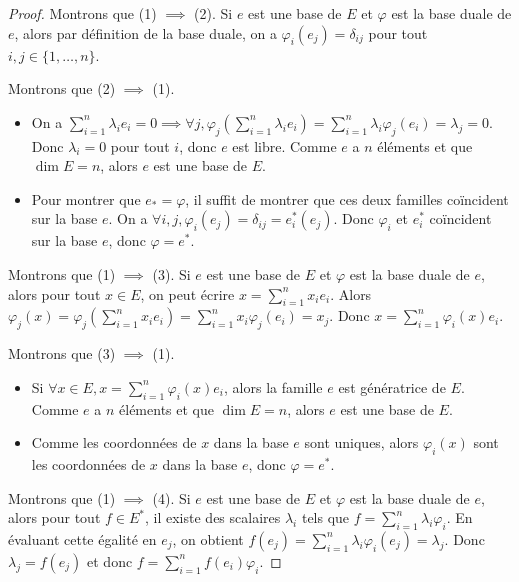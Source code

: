 \documentclass[11pt,a4paper]{report}
\begin{document}
\begin{proof}
    Montrons que (1) $\implies$ (2). Si $e$ est une base de $E$ et $\varphi$ est la base duale de $e$, alors par définition de la base duale, on a $\varphi_i(e_j) = \delta_{ij}$ pour tout $i,j \in \{1,\dots,n\}$.

    Montrons que (2) $\implies$ (1).
    \begin{itemize}
        \item On a $\sum_{i=1}^n \lambda_i e_i = 0 \implies \forall j, \varphi_j\left(\sum_{i=1}^n \lambda_i e_i\right) = \sum_{i=1}^n \lambda_i \varphi_j(e_i) = \lambda_j = 0$. Donc $\lambda_i = 0$ pour tout $i$, donc $e$ est libre. Comme $e$ a $n$ éléments et que $\dim E = n$, alors $e$ est une base de $E$.
        \item Pour montrer que $e_* = \varphi$, il suffit de montrer que ces deux familles coïncident sur la base $e$. On a $\forall i,j, \varphi_i(e_j) = \delta_{ij} = e_i^*(e_j)$. Donc $\varphi_i$ et $e_i^*$ coïncident sur la base $e$, donc $\varphi = e^*$.
    \end{itemize}

    Montrons que (1) $\implies$ (3). Si $e$ est une base de $E$ et $\varphi$ est la base duale de $e$, alors pour tout $x \in E$, on peut écrire $x = \sum_{i=1}^n x_i e_i$. Alors $\varphi_j(x) = \varphi_j\left(\sum_{i=1}^n x_i e_i\right) = \sum_{i=1}^n x_i \varphi_j(e_i) = x_j$. Donc $x = \sum_{i=1}^n \varphi_i(x) e_i$.

    Montrons que (3) $\implies$ (1).
    \begin{itemize}
        \item Si $\forall x \in E, x= \sum_{i=1}^n \varphi_i(x) e_i$, alors la famille $e$ est génératrice de $E$. Comme $e$ a $n$ éléments et que $\dim E = n$, alors $e$ est une base de $E$.
        \item Comme les coordonnées de $x$ dans la base $e$ sont uniques, alors $\varphi_i(x)$ sont les coordonnées de $x$ dans la base $e$, donc $\varphi = e^*$.
    \end{itemize}

    Montrons que (1) $\implies$ (4). Si $e$ est une base de $E$ et $\varphi$ est la base duale de $e$, alors pour tout $f \in E^*$, il existe des scalaires $\lambda_i$ tels que $f = \sum_{i=1}^n \lambda_i \varphi_i$. En évaluant cette égalité en $e_j$, on obtient $f(e_j) = \sum_{i=1}^n \lambda_i \varphi_i(e_j) = \lambda_j$. Donc $\lambda_j = f(e_j)$ et donc $f = \sum_{i=1}^n f(e_i) \varphi_i$.


\end{proof}
\end{document}
